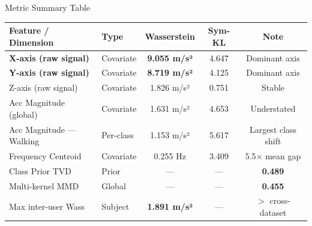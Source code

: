 \documentclass[aspectratio=169, 10pt]{beamer}
\begin{document}
\begin{frame}{Metric Summary Table}
  \begin{center}
  \small
  \begin{tabular}{llccc}
    \toprule
    \textbf{Feature / Dimension} & \textbf{Type} & \textbf{Wasserstein} & \textbf{Sym-KL} & \textbf{Note} \\
    \midrule
    \rowcolor{red!10}
    \textbf{X-axis (raw signal)}  & Covariate & \textbf{9.055 m/s²} & 4.647 & Dominant axis \\
    \rowcolor{red!10}
    \textbf{Y-axis (raw signal)}  & Covariate & \textbf{8.719 m/s²} & 4.125 & Dominant axis \\
    Z-axis (raw signal)           & Covariate & 1.826 m/s² & 0.751 & Stable \\
    Acc Magnitude (global)        & Covariate & 1.631 m/s² & 4.653 & Understated \\
    Acc Magnitude — Walking       & Per-class & 1.153 m/s² & 5.617 & Largest class shift \\
    Frequency Centroid            & Covariate & 0.255 Hz   & 3.409 & 5.5$\times$ mean gap \\
    \midrule
    Class Prior TVD               & Prior     & ---         & ---   & \textbf{0.489} \\
    Multi-kernel MMD              & Global    & ---         & ---   & \textbf{0.455} \\
    \rowcolor{yellow!25}
    Max inter-user Wass           & Subject   & \textbf{1.891 m/s²} & --- & $>$ cross-dataset \\
    \bottomrule
  \end{tabular}
  \end{center}
\end{frame}

\end{document}
